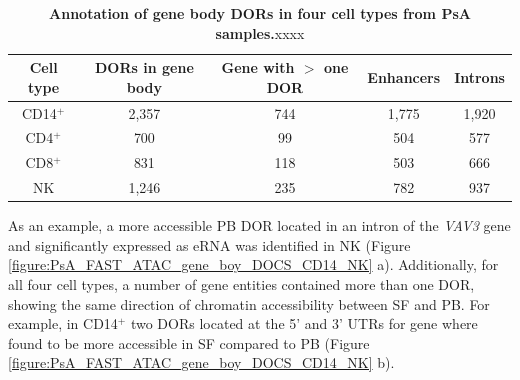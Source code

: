 
\begin{table}[htbp]
\centering
\begin{tabular}{@{} c c c c c}
\toprule
\textbf{Cell type} & \textbf{DORs in gene body} &  \textbf{Gene with $>$ one DOR} &\textbf{Enhancers} & \textbf{Introns} \\
\midrule
\midrule
CD14$^+$ & 2,357 & 744 & 1,775 & 1,920 \\
CD4$^+$ & 700 & 99 & 504 & 577 \\
CD8$^+$ & 831 & 118 & 503 & 666 \\
NK   & 1,246 & 235 & 782 & 937 \\   
\bottomrule
\end{tabular}
\medskip %
\caption[Annotation of gene body DORs in four cell types from PsA samples.]{\textbf{Annotation of gene body DORs in four cell types from PsA samples.}xxxx}
\label{tab:PSA_DOCs_gene_body}
\end{table}

As an example, a more accessible PB DOR located in an intron of the \textit{VAV3} gene and significantly expressed as eRNA was identified in NK (Figure \ref{figure:PsA_FAST_ATAC_gene_boy_DOCS_CD14_NK} a). Additionally, for all four cell types, a number of gene entities contained more than one DOR, showing the same direction of chromatin accessibility between SF and PB. For example, in CD14$^+$ two DORs located at the 5' and 3' UTRs for  gene where found to be more accessible in SF compared to PB (Figure \ref{figure:PsA_FAST_ATAC_gene_boy_DOCS_CD14_NK} b). 

